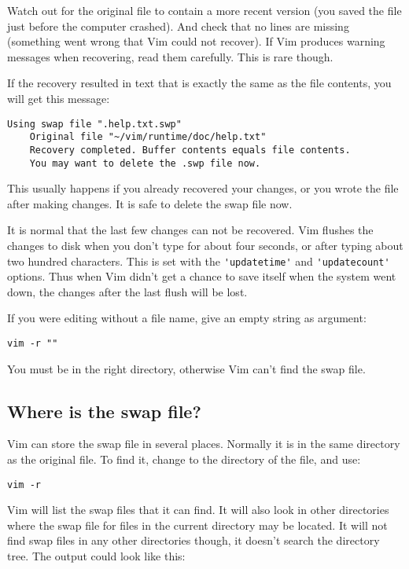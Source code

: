 Watch out for the original file to contain a more recent version (you saved the file just before the computer crashed).
And check that no lines are missing (something went wrong that Vim could not recover).
If Vim produces warning messages when recovering, read them carefully.
This is rare though.

If the recovery resulted in text that is exactly the same as the file contents, you will get this message:

\begin{Verbatim}[samepage=true]
    Using swap file ".help.txt.swp" 
    Original file "~/vim/runtime/doc/help.txt" 
    Recovery completed. Buffer contents equals file contents. 
    You may want to delete the .swp file now. 
\end{Verbatim}

This usually happens if you already recovered your changes, or you wrote the file after making changes.
It is safe to delete the swap file now.

It is normal that the last few changes can not be recovered.
Vim flushes the changes to disk when you don't type for about four seconds, or after typing about two hundred characters.
This is set with the \verb!'updatetime'! and \verb!'updatecount'! options.
Thus when Vim didn't get a chance to save itself when the system went down, the changes after the last flush will be lost.

If you were editing without a file name, give an empty string as argument:

\begin{Verbatim}[samepage=true]
 vim -r ""
\end{Verbatim}

You must be in the right directory, otherwise Vim can't find the swap file.
\subsection{Where is the swap file?}
Vim can store the swap file in several places.
Normally it is in the same directory as the original file.
To find it, change to the directory of the file, and use:

\begin{Verbatim}[samepage=true]
 vim -r
\end{Verbatim}

Vim will list the swap files that it can find.
It will also look in other directories where the swap file for files in the current directory may be located.
It will not find swap files in any other directories though, it doesn't search the directory tree.
The output could look like this:

